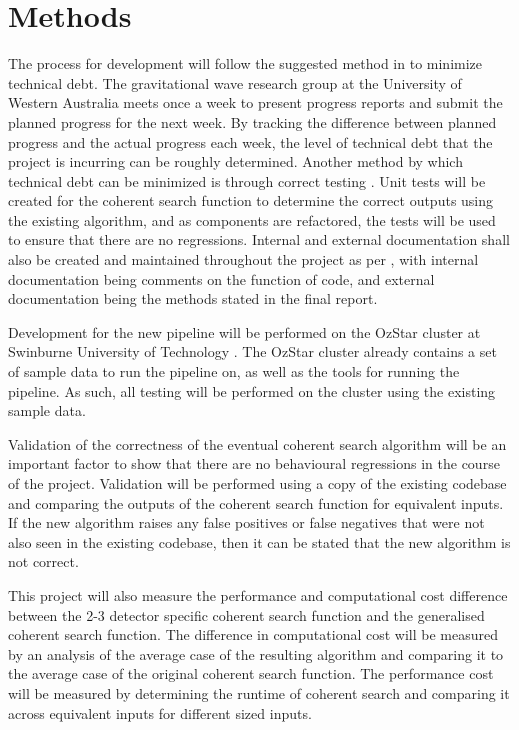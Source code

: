 \documentclass{article}
\begin{document}
\section{Methods} \label{sec:method}

The process for development will follow the suggested method in \cite{Fairley} to minimize
technical debt. The gravitational wave research group at the University of Western Australia meets
once a week to present progress reports and submit the planned progress for the next week. By
tracking the difference between planned progress and the actual progress each week, the level of
technical debt that the project is incurring can be roughly determined. Another method by which
technical debt can be minimized is through correct testing \cite{Allman}. Unit tests will be created
for the coherent search function to determine the correct outputs using the existing algorithm,
and as components are refactored, the tests will be used to ensure that there are no regressions.
Internal and external documentation shall also be created and maintained throughout the project as
per \cite{Allman}, with internal documentation being comments on the function of code, and
external documentation being the methods stated in the final report.

Development for the new pipeline will be performed on the OzStar cluster at Swinburne University of
Technology \cite{ozstar}. The OzStar cluster already contains a set of sample data to run the
pipeline on, as well as the tools for running the pipeline. As such, all testing will be performed
on the cluster using the existing sample data.

Validation of the correctness of the eventual coherent search algorithm will be an important factor
to show that there are no behavioural regressions in the course of the project. Validation will be
performed using a copy of the existing codebase and comparing the outputs of the coherent search
function for equivalent inputs. If the new algorithm raises any false positives or false
negatives that were not also seen in the existing codebase, then it can be stated that the new
algorithm is not correct.

This project will also measure the performance and computational cost difference between the 2-3
detector specific coherent search function and the generalised coherent search function. The
difference in computational cost will be measured by an analysis of the average case of the
resulting algorithm and comparing it to the average case of the original coherent search function.
The performance cost will be measured by determining the runtime of coherent search and
comparing it across equivalent inputs for different sized inputs.
\end{document}
